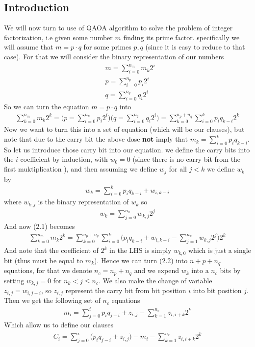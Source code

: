 \documentclass[12pt]{amsart}
\numberwithin{equation}{section}
\theoremstyle{definition}
\begin{document}
\subsection{ Introduction}
We will now turn to use of QAOA algorithm to solve the problem of integer factorization, i.e given some number $m$ finding its prime factor. specifically we will assume that $m=p\cdot q$ for some primes $p,q$ (since it is easy to reduce to that case). For that we will consider the binary representation of our numbers\begin{align*}
   &m=\sum_{i=0}^{n_m}m_k2^i 
    \\&p=\sum_{i=0}^{n_p}p_i2^i 
   \\&q=\sum_{i=0}^{n_q}q_i2^i
\end{align*}
So we can turn the equation $m=p\cdot q$ into \begin{align}
    \sum_{k=0}^{n_m}m_k2^k =\Big(p=\sum_{i=0}^{n_p}p_i2^i \Big)\Big(q=\sum_{i=0}^{n_q}q_i2^i \Big)=\sum_{k=0}^{n_p+n_q} \sum_{i=0}^k p_iq_{k-i}2^k
\end{align}
Now we want to turn this into a set of equation (which will be our clauses), but note that due to the carry bit the above dose \textbf{not} imply that $m_k=\sum_{i=0}^k p_iq_{k-i}$. So let us introduce those carry bit into our equation. we define the carry bits into the $i$ coefficient by induction, with $w_0=0$ (since there is no carry bit from the first muktiplication ), and then assuming we define $w_j$ for all $j<k$ we define $w_k$ by \begin{align*}
    w_k= \sum_{i=0}^k p_iq_{k-i}+ w_{i,k-i}
\end{align*}
where $w_{k,j}$ is the binary representation of $w_k$ so \begin{align*}
    w_k=\sum_{j=0}^{n_k} w_{k,j}2^j
\end{align*}
And now (2.1) becomes 
\begin{align}
    \sum_{k=0}^{n_m}m_k2^k=\sum_{k=0}^{n_p+n_q}\sum_{i=0}^k \Big(p_iq_{k-i}+w_{i,k-i}-\sum_{j=1}^{n_k}w_{k,j}2^{j}\Big)2^k 
\end{align}
And note that the coefficient of $2^k$ in the LHS is simply $w_{k,0}$ which is just a single bit (thus must be equal to $m_k$). Hence we can turn (2.2) into $n+p+n_q$ equations, for that we denote $n_c=n_p+n_q$ and we expend $w_k$ into a $n_c$ bits by setting $w_{k,j}=0$ for $n_k<j\leq n_c$. We
also make the change of variable $z_{i,j}=w_{i,j-i}$, so $z_{i,j}$ represent the carry bit from bit position $i$ into bit position $j$. Then we get the following set of $n_c$ equations 
\begin{align}
m_i=\sum_{j=0}^i p_iq_{j-i}+z_{i,j}-\sum_{k=1}^{n_c} z_{i,i+k}2^k 
\end{align}
Which allow us to define our clauses \begin{align}
    C_i=\sum_{j=0}^i \big(p_iq_{j-i}+z_{i,j}\big)-m_i-\sum_{k=1}^{n_c} z_{i,i+k}2^k
\end{align}
\end{document}
